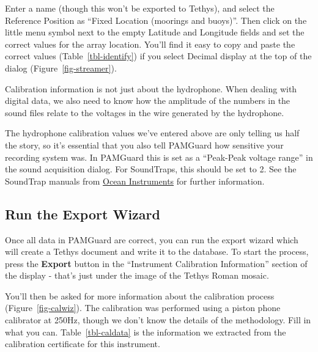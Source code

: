 \documentclass[
]{article}
\begin{document}
Enter a name (though this won't be exported to Tethys), and select the
Reference Position as ``Fixed Location (moorings and buoys)''. Then
click on the little menu symbol next to the empty Latitude and Longitude
fields and set the correct values for the array location. You'll find it
easy to copy and paste the correct values (Table~\ref{tbl-identify}) if
you select Decimal display at the top of the dialog
(Figure~\ref{fig-streamer}).

\begin{tcolorbox}[enhanced jigsaw, colback=white, coltitle=black, titlerule=0mm, opacityback=0, bottomtitle=1mm, colframe=quarto-callout-important-color-frame, leftrule=.75mm, colbacktitle=quarto-callout-important-color!10!white, rightrule=.15mm, breakable, arc=.35mm, toptitle=1mm, left=2mm, title=\textcolor{quarto-callout-important-color}{\faExclamation}\hspace{0.5em}{Complete Calibration Data}, toprule=.15mm, bottomrule=.15mm, opacitybacktitle=0.6]

Calibration information is not just about the hydrophone. When dealing
with digital data, we also need to know how the amplitude of the numbers
in the sound files relate to the voltages in the wire generated by the
hydrophone.

The hydrophone calibration values we've entered above are only telling
us half the story, so it's essential that you also tell PAMGuard how
sensitive your recording system was. In PAMGuard this is set as a
``Peak-Peak voltage range'' in the sound acquisition dialog. For
SoundTraps, this should be set to 2. See the SoundTrap manuals from
\href{https://www.oceaninstruments.co.nz/}{Ocean Instruments} for
further information.

\end{tcolorbox}

\subsection{Run the Export Wizard}\label{run-the-export-wizard}

Once all data in PAMGuard are correct, you can run the export wizard
which will create a Tethys document and write it to the database. To
start the process, press the \textbf{Export} button in the ``Instrument
Calibration Information'' section of the display - that's just under the
image of the Tethys Roman mosaic.

You'll then be asked for more information about the calibration process
(Figure~\ref{fig-calwiz}). The calibration was performed using a piston
phone calibrator at 250Hz, though we don't know the details of the
methodology. Fill in what you can. Table~\ref{tbl-caldata} is the
information we extracted from the calibration certificate for this
instrument.
\end{document}
